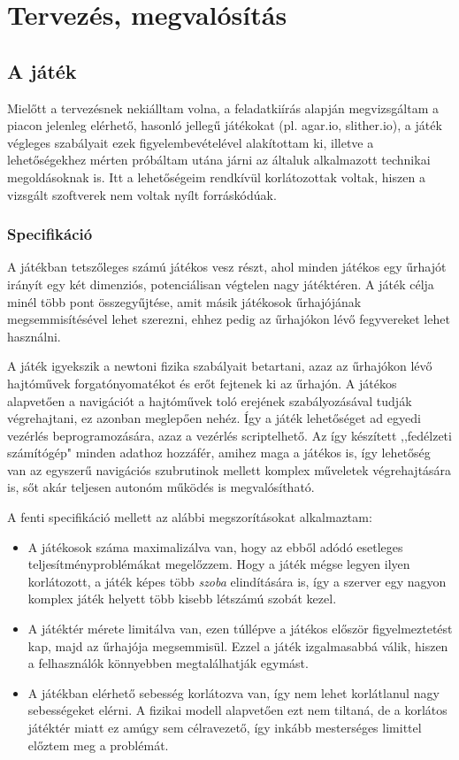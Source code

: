 \chapter{Tervezés, megvalósítás}

\section{A játék}

Mielőtt a tervezésnek nekiálltam volna, a feladatkiírás alapján megvizsgáltam a
piacon jelenleg elérhető, hasonló jellegű játékokat (pl. agar.io, slither.io), a
játék végleges szabályait ezek figyelembevételével alakítottam ki, illetve a
lehetőségekhez mérten próbáltam utána járni az általuk alkalmazott technikai
megoldásoknak is.  Itt a lehetőségeim rendkívül korlátozottak voltak, hiszen a
vizsgált szoftverek nem voltak nyílt forráskódúak.

\subsection{Specifikáció}

A játékban tetszőleges számú játékos vesz részt, ahol minden játékos egy űrhajót
irányít egy két dimenziós, potenciálisan végtelen nagy játéktéren. A játék célja
minél több pont összegyűjtése, amit másik játékosok űrhajójának
megsemmisítésével lehet szerezni, ehhez pedig az űrhajókon lévő fegyvereket
lehet használni.

A játék igyekszik a newtoni fizika szabályait betartani, azaz az űrhajókon lévő
hajtóművek forgatónyomatékot és erőt fejtenek ki az űrhajón. A játékos
alapvetően a navigációt a hajtóművek toló erejének szabályozásával tudják
végrehajtani, ez azonban meglepően nehéz. Így a játék lehetőséget ad egyedi
vezérlés beprogramozására, azaz a vezérlés scriptelhető. Az így készített
,,fedélzeti számítógép" minden adathoz hozzáfér, amihez maga a játékos is, így
lehetőség van az egyszerű navigációs szubrutinok mellett komplex műveletek
végrehajtására is, sőt akár teljesen autonóm működés is megvalósítható.

A fenti specifikáció mellett az alábbi megszorításokat alkalmaztam:

\begin{itemize}
  \item A játékosok száma maximalizálva van, hogy az ebből adódó esetleges
    teljesítményproblémákat megelőzzem. Hogy a játék mégse legyen ilyen
    korlátozott, a játék képes több \emph{szoba} elindítására is, így a szerver
    egy nagyon komplex játék helyett több kisebb létszámú szobát kezel.
  \item A játéktér mérete limitálva van, ezen túllépve a játékos először
    figyelmeztetést kap, majd az űrhajója megsemmisül. Ezzel a játék
    izgalmasabbá válik, hiszen a felhasználók könnyebben megtalálhatják egymást.
  \item A játékban elérhető sebesség korlátozva van, így nem lehet korlátlanul
    nagy sebességeket elérni. A fizikai modell alapvetően ezt nem tiltaná, de a
    korlátos játéktér miatt ez amúgy sem célravezető, így inkább mesterséges
    limittel előztem meg a problémát.
\end{itemize}

